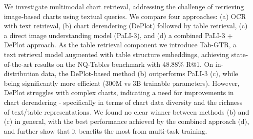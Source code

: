 We investigate multimodal chart retrieval, addressing the challenge of retrieving image-based charts using textual queries. We compare four approaches: (a) OCR with text retrieval, (b) chart derendering (DePlot) followed by table retrieval, (c) a direct image understanding model (PaLI-3), and (d) a combined PaLI-3 + DePlot approach. As the table retrieval component we introduce Tab-GTR, a text retrieval model augmented with table structure embeddings, achieving state-of-the-art results on the NQ-Tables benchmark with 48.88\% R@1. On in-distribution data, the DePlot-based method (b) outperforms PaLI-3 (c), while being significantly more efficient (300M vs 3B trainable parameters). However, DePlot struggles with complex charts, indicating a need for improvements in chart derendering - specifically in terms of chart data diversity and the richness of text/table representations. We found no clear winner between methods (b) and (c) in general, with the best performance achieved by the combined approach (d), and further show that it benefits the most from multi-task training.